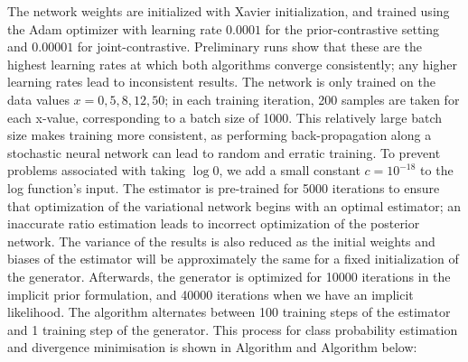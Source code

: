 \documentclass[a4paper,12pt]{article}
\numberwithin{equation}{section}
\begin{document}
The network weights are initialized with Xavier initialization, and trained using the Adam optimizer with learning rate $0.0001$ for the prior-contrastive setting and $0.00001$ for joint-contrastive. Preliminary runs show that these are the highest learning rates at which both algorithms converge consistently; any higher learning rates lead to inconsistent results. The network is only trained on the data values $x=0,5,8,12,50$; in each training iteration, 200 samples are taken for each x-value, corresponding to a batch size of 1000. This relatively large batch size makes training more consistent, as performing back-propagation along a stochastic neural network can lead to random and erratic training. To prevent problems associated with taking $\log 0$, we add a small constant $c=10^{-18}$ to the log function's input. The estimator is pre-trained for 5000 iterations to ensure that optimization of the variational network begins with an optimal estimator; an inaccurate ratio estimation leads to incorrect optimization of the posterior network. The variance of the results is also reduced as the initial weights and biases of the estimator will be approximately the same for a fixed initialization of the generator. Afterwards, the generator is optimized for 10000 iterations in the implicit prior formulation, and 40000 iterations when we have an implicit likelihood. The algorithm alternates between 100 training steps of the estimator and 1 training step of the generator. This process for class probability estimation and divergence minimisation is shown in Algorithm and Algorithm below:
\end{document}

